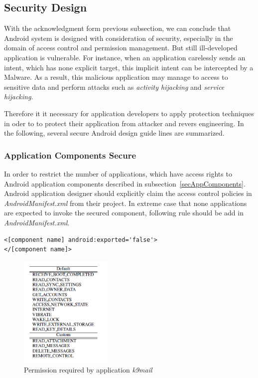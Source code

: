 \subsection{Security Design}
With the acknowledgment form previous subsection, we can conclude that Android system is designed with consideration of security, especially in the domain of access control and permission management. But still ill-developed application is vulnerable. For instance, when an application carelessly sends an intent, which has none explicit target, this implicit intent can be intercepted by a Malware. As a result, this malicious application may manage to access to sensitive data and perform attacks such as \emph{activity hijacking} and \emph{service hijacking}\cite{android_secure_inter}.

Therefore it it necessary for application developers to apply protection techniques  in oder to to protect their application from attacker and revers engineering.  In the following, several secure Android design guide lines are summarized.
\subsubsection{Application Components Secure}
In order to restrict the number of applications, which have access rights to Android application components described in subsection~\ref{secAppComponents}. Android application designer  should explicitly claim the access control policies in \emph{AndroidManifest.xml} from their project. In extreme case that none applications are expected to invoke the secured component, following rule should be add in \emph{AndroidManifest.xml}\cite{android_secure_cook}.
\begin{Verbatim}[fontsize=\relsize{-1},frame=lines,framesep=4mm, label=\fbox{\small\emph{Component Securing}}]
<[component name] android:exported='false'>
</[component name]>
\end{Verbatim} 

\begin{figure}[!htb]
	\centering
	\includegraphics[width=0.4\textwidth]{android-permission2.jpg}
		\caption{Permission required by application \emph{k9mail}\cite{android_secure_design}}
	\label{fig:android-permission2}
\end{figure}
